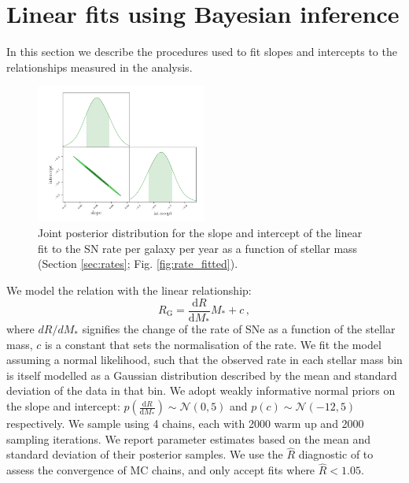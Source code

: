 \documentclass[fleqn,usenatbib]{mnras}
\begin{document}


\appendix

\section{Linear fits using Bayesian inference}
In this section we describe the procedures used to fit slopes and intercepts to the relationships measured in the analysis.

\label{appendix:linear_fits}

\begin{figure}
    \centering
    \includegraphics[width=0.5\textwidth]{figs/fit_fine_BC03_corner.png}
    \caption{Joint posterior distribution for the slope and intercept of the linear fit to the SN rate per galaxy per year as a function of stellar mass (Section \ref{sec:rates}; Fig. \ref{fig:rate_fitted}).}
    \label{fig:corner_slope_int}
\end{figure}

We model the relation with the linear relationship: 
\begin{equation}
    R_{\mathrm{G}} = \frac{\mathrm{d}R}{\mathrm{d}M_*} M_* + c \,,
\label{eq:rate_fit}
\end{equation}
where $dR/dM_*$ signifies the change of the rate of SNe as a function of the stellar mass, $c$ is a constant that sets the normalisation of the rate. We fit the model assuming a normal likelihood, such that the observed rate in each stellar mass bin is itself modelled as a Gaussian distribution described by the mean and standard deviation of the data in that bin. We adopt weakly informative normal priors on the slope and intercept: $p\left(\frac{\mathrm{d}R}{\mathrm{d}M_*}\right) \sim \mathcal{N}\left(0,5\right)$ and  $p\left(c\right) \sim \mathcal{N}\left(-12,5\right)$ respectively. We sample using 4 chains, each with 2000 warm up and 2000 sampling iterations. We report parameter estimates based on the mean and standard deviation of their posterior samples. We use the $\hat{R}$ diagnostic of \citep{Vehtari2019} to assess the convergence of MC chains, and only accept fits where $\hat{R}<1.05$.
\end{document}
